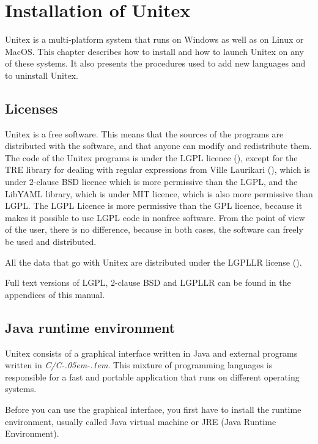 \chapter{Installation of Unitex}
\label{chap-install}

Unitex is a multi-platform system that runs on Windows as well as on Linux or
MacOS. This chapter describes how to install and how to launch Unitex on any of
these systems. It also presents the procedures used to add new languages and to
uninstall Unitex.

\section{Licenses}
\label{section-licences}
Unitex is a free software. This means that the sources of the programs are
distributed with the software, and that anyone can modify and redistribute them.
The code of the Unitex programs is under the LGPL licence (\cite{LGPL}), except
for the TRE library for dealing with regular expressions from Ville Laurikari
(\cite{TRE}), which is under 2-clause BSD licence which is more
permissive than the LGPL, and the LibYAML library, which is under MIT licence, which is 
also more permissive than LGPL. The LGPL Licence is more permissive than the GPL
licence, because it makes it possible to use LGPL code in nonfree software. 
From the point of view of the user, there is no difference,
because in both cases, the software can freely be used and distributed.

\bigskip
\noindent All the data that go with Unitex are distributed under the LGPLLR
license  (\cite{LGPLLR}).

\bigskip
\noindent Full text versions of LGPL, 2-clause BSD and LGPLLR can be found in
the appendices of this manual.

\section{Java runtime environment}
Unitex consists of a graphical interface written in Java and external programs
written in \textit{C/C\kern-.05em\raisebox{.5ex}{++}\kern-.1em}. This mixture of
programming languages is responsible for a fast and portable application that
runs on different operating systems.

\bigskip
\noindent Before you can use the graphical interface, you first have to install the runtime
environment, usually called Java virtual machine  or
JRE (Java Runtime Environment).

